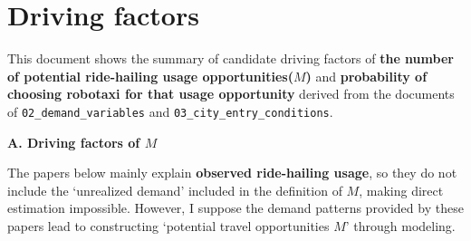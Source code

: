 \documentclass[10pt,a4paper]{article}
\newcommand{\hd}[1]{\par\vspace{8pt}\textbf{#1}\par\vspace{3pt}}
\begin{document}
\section{Driving factors}
This document shows the summary of candidate driving factors of \textbf{the number of potential ride-hailing usage opportunities($M$)} and \textbf{probability of choosing robotaxi for that
usage opportunity} derived from the documents of \texttt{02\_demand\_variables} and \texttt{03\_city\_entry\_conditions}.

\hd{A. Driving factors of $M$}
The papers below mainly explain \textbf{observed ride-hailing usage}, so they do not include the `unrealized demand' included in the definition of $M$, making direct estimation impossible. However, I suppose the demand patterns provided by these papers lead to constructing `potential travel opportunities $M$' through modeling.
\end{document}
